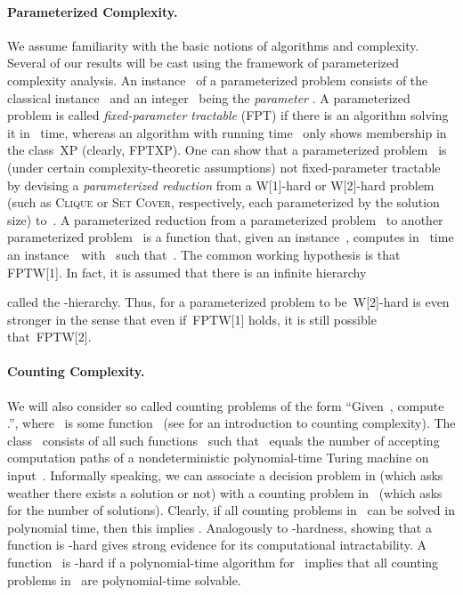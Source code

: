 \documentclass{article}
\begin{document}
\paragraph{Parameterized Complexity.}
We assume familiarity with the basic notions of algorithms and complexity.
Several of our results will be cast using the framework of parameterized complexity analysis.
An instance~ of a parameterized problem consists of the classical
instance~ and an integer~ being the \emph{parameter} \cite{DF13,FG06,Nie06,Cyg15}.
A parameterized problem is called \emph{fixed-parameter tractable} (FPT) if there is an algorithm solving it in~ time, whereas an algorithm with running time~ only shows membership in the class~XP (clearly, FPTXP).
One can show that a parameterized problem~ is (under certain complexity-theoretic assumptions) not fixed-parameter tractable by devising a \emph{parameterized reduction} from a
W[1]-hard or W[2]-hard problem (such as \textsc{Clique} or \textsc{Set
Cover}, respectively, each parameterized by the solution size) to~.
A parameterized reduction from a parameterized problem~ to another parameterized problem~ is a function that, given an instance~, computes in~ time an instance~~with~ such that~.
The common working hypothesis is that FPTW[1]. In fact, it is assumed that there is an infinite hierarchy

called the -hierarchy. Thus, for a parameterized problem to be~W[2]-hard is even stronger
in the sense that even if~FPTW[1] holds, it is still possible that~FPTW[2].

\paragraph{Counting Complexity.}
We will also consider so called counting problems of the form ``Given~, compute .'', where~ is some function~ (see \citet[Chapter~9]{AB09} for an introduction to counting complexity).
The class~ consists of all such functions~ such that~ equals the number of accepting computation paths of a nondeterministic polynomial-time Turing machine on input~.
Informally speaking, we can associate a decision problem in  (which asks weather there exists a solution or not) with a counting problem in~ (which asks for the number of solutions).
Clearly, if all counting problems in~ can be solved in polynomial time, then this implies .
Analogously to -hardness, showing that a function
is -hard gives strong evidence for its computational intractability.
A function~ is -hard if a polynomial-time algorithm for~ implies that all counting problems in~ are polynomial-time solvable.
\end{document}
